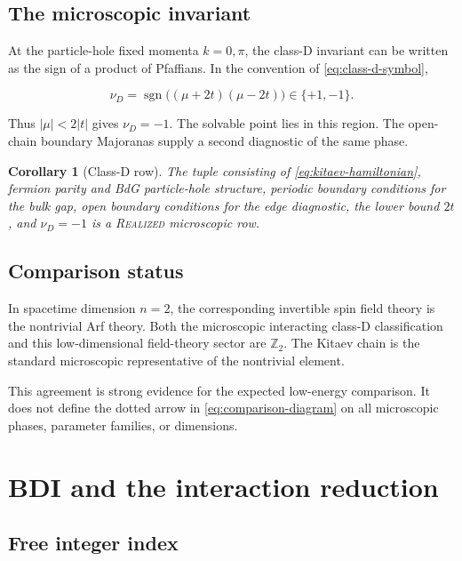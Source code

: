 \documentclass[12pt]{article}
\newtheorem{corollary}[theorem]{Corollary}
\theoremstyle{definition}
\theoremstyle{remark}
\newcommand{\REAL}{\textnormal{\textsc{Realized}}}
\begin{document}
\subsection{The microscopic invariant}

At the particle-hole fixed momenta $k=0,\pi$, the class-D invariant can be
written as the sign of a product of Pfaffians.  In the convention of
\cref{eq:class-d-symbol},

\begin{equation}
  \nu_D=\operatorname{sgn}\bigl((\mu+2t)(\mu-2t)\bigr)\in\{+1,-1\}.
  \label{eq:pfaffian-invariant}
\end{equation}

Thus $|\mu|<2|t|$ gives $\nu_D=-1$.  The solvable point lies in this region.
The open-chain boundary Majoranas supply a second diagnostic of the same
phase.

\begin{corollary}[Class-D row]
The tuple consisting of \cref{eq:kitaev-hamiltonian}, fermion parity and BdG
particle-hole structure, periodic boundary conditions for the bulk gap, open
boundary conditions for the edge diagnostic, the lower bound $2t$, and
$\nu_D=-1$ is a \REAL{} microscopic row.
\end{corollary}

\subsection{Comparison status}

In spacetime dimension $n=2$, the corresponding invertible spin field theory
is the nontrivial Arf theory.  Both the microscopic interacting class-D
classification and this low-dimensional field-theory sector are
$\mathbb Z_2$.  The Kitaev chain is the standard microscopic representative
of the nontrivial element.

This agreement is strong evidence for the expected low-energy comparison.
It does not define the dotted arrow in \cref{eq:comparison-diagram} on all
microscopic phases, parameter families, or dimensions.

\section{BDI and the interaction reduction}
\label{sec:bdi}

\subsection{Free integer index}
\end{document}
